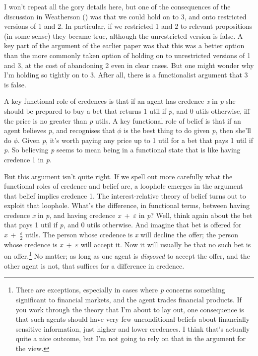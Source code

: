 \documentclass[
  11pt,
  letterpaper,
  DIV=11,
  numbers=noendperiod,
  twoside]{scrartcl}
\begin{document}
I won't repeat all the gory details here, but one of the consequences of
the discussion in Weatherson
() was that we could hold on
to 3, and onto restricted versions of 1 and 2. In particular, if we
restricted 1 and 2 to relevant propositions (in some sense) they became
true, although the unrestricted version is false. A key part of the
argument of the earlier paper was that this was a better option than the
more commonly taken option of holding on to unrestricted versions of 1
and 3, at the cost of abandoning 2 even in clear cases. But one might
wonder why I'm holding so tightly on to 3. After all, there is a
functionalist argument that 3 is false.

A key functional role of credences is that if an agent has credence
\emph{x} in \emph{p} she should be prepared to buy a bet that returns 1
util if \emph{p}, and 0 utils otherwise, iff the price is no greater
than \emph{p} utils. A key functional role of belief is that if an agent
believes \emph{p}, and recognises that \(\phi\) is the best thing to do
given \emph{p}, then she'll do \(\phi\). Given \emph{p}, it's worth
paying any price up to 1 util for a bet that pays 1 util if \emph{p}. So
believing \emph{p} seems to mean being in a functional state that is
like having credence 1 in \emph{p}.

But this argument isn't quite right. If we spell out more carefully what
the functional roles of credence and belief are, a loophole emerges in
the argument that belief implies credence 1. The interest-relative
theory of belief turns out to exploit that loophole. What's the
difference, in functional terms, between having credence \emph{x} in
\emph{p}, and having credence \emph{x}~+~\(\varepsilon\) in \emph{p}?
Well, think again about the bet that pays 1 util if \emph{p}, and 0
utils otherwise. And imagine that bet is offered for
\emph{x}~+~\(\frac{\varepsilon}{2}\) utils. The person whose credence is
\emph{x} will decline the offer; the person whose credence is
\emph{x}~+~\(\varepsilon\) will accept it. Now it will usually be that
no such bet is on offer.\footnote{There are exceptions, especially in
  cases where \emph{p} concerns something significant to financial
  markets, and the agent trades financial products. If you work through
  the theory that I'm about to lay out, one consequence is that such
  agents should have very few unconditional beliefs about
  financially-sensitive information, just higher and lower credences. I
  think that's actually quite a nice outcome, but I'm not going to rely
  on that in the argument for the view.} No matter; as long as one agent
is \emph{disposed} to accept the offer, and the other agent is not, that
suffices for a difference in credence.
\end{document}
